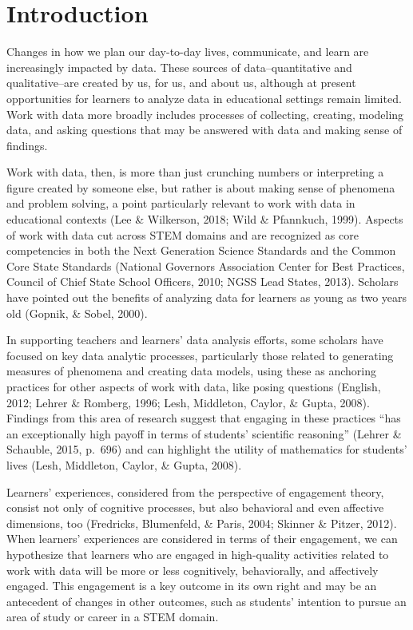 \documentclass[]{msu-thesis}
\theoremstyle{definition}
\theoremstyle{definition}
\theoremstyle{definition}
\theoremstyle{remark}
\begin{document}
\chapter{Introduction}\label{intro}

\DoubleSpacing

Changes in how we plan our day-to-day lives, communicate, and learn are
increasingly impacted by data. These sources of data--quantitative and
qualitative--are created by us, for us, and about us, although at
present opportunities for learners to analyze data in educational
settings remain limited. Work with data more broadly includes processes
of collecting, creating, modeling data, and asking questions that may be
answered with data and making sense of findings.

Work with data, then, is more than just crunching numbers or
interpreting a figure created by someone else, but rather is about
making sense of phenomena and problem solving, a point particularly
relevant to work with data in educational contexts (Lee \& Wilkerson,
2018; Wild \& Pfannkuch, 1999). Aspects of work with data cut across
STEM domains and are recognized as core competencies in both the Next
Generation Science Standards and the Common Core State Standards
(National Governors Association Center for Best Practices, Council of
Chief State School Officers, 2010; NGSS Lead States, 2013). Scholars
have pointed out the benefits of analyzing data for learners as young as
two years old (Gopnik, \& Sobel, 2000).

In supporting teachers and learners' data analysis efforts, some
scholars have focused on key data analytic processes, particularly those
related to generating measures of phenomena and creating data models,
using these as anchoring practices for other aspects of work with data,
like posing questions (English, 2012; Lehrer \& Romberg, 1996; Lesh,
Middleton, Caylor, \& Gupta, 2008). Findings from this area of research
suggest that engaging in these practices ``has an exceptionally high
payoff in terms of students' scientific reasoning'' (Lehrer \& Schauble,
2015, p.~696) and can highlight the utility of mathematics for students'
lives (Lesh, Middleton, Caylor, \& Gupta, 2008).

Learners' experiences, considered from the perspective of engagement
theory, consist not only of cognitive processes, but also behavioral and
even affective dimensions, too (Fredricks, Blumenfeld, \& Paris, 2004;
Skinner \& Pitzer, 2012). When learners' experiences are considered in
terms of their engagement, we can hypothesize that learners who are
engaged in high-quality activities related to work with data will be
more or less cognitively, behaviorally, and affectively engaged. This
engagement is a key outcome in its own right and may be an antecedent of
changes in other outcomes, such as students' intention to pursue an area
of study or career in a STEM domain.
\end{document}
